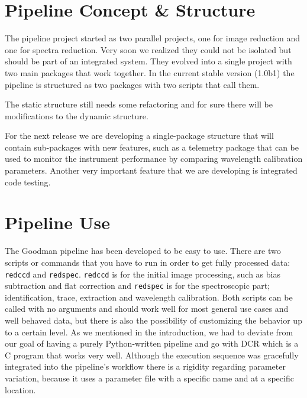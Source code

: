 \documentclass[11pt,twoside]{article}
\begin{document}
\section{Pipeline Concept \& Structure}

The pipeline project started as two parallel projects, one for image reduction
and one for spectra reduction. Very soon we realized they could not be isolated 
but should be part of an integrated system. They evolved into a single project with two main
packages that work together. In the current stable version (1.0b1) the pipeline is
structured as two packages with two scripts that call them.

The static structure still needs some refactoring and for sure there will be
modifications to the dynamic structure. 

% 
% 

For the next release we are developing a single-package structure that will
contain sub-packages with new features, such as a telemetry package that can be used
to monitor the instrument performance by comparing wavelength calibration parameters.
Another very important feature that we are developing is integrated code testing.

\section{Pipeline Use}
The Goodman pipeline has been developed to be easy to use. There are two scripts
or commands that you have to run in order to get fully processed data:
\verb=redccd= and \verb=redspec=.
\verb=redccd= is for the initial image processing, such as bias
subtraction and flat correction and \verb=redspec= is for the spectroscopic
part; identification, trace, extraction and wavelength calibration.
Both scripts can be called with no arguments and should work well for most general use cases
and well behaved data, but there is also the possibility of customizing the behavior
up to a certain level. As we mentioned in the introduction, we had to deviate from
our goal of having a purely Python-written pipeline and go with DCR which is a 
C program that works very well. Although the execution sequence was
gracefully integrated into the pipeline's workflow there is a rigidity regarding
parameter variation, because it uses a parameter file with a specific name and at
a specific location.
\end{document}
